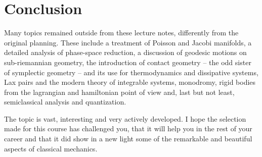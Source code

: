 \documentclass[english,fontsize=11pt,paper=b5]{scrbook}
\numberwithin{equation}{chapter}
\theoremstyle{definition}
\begin{document}
      \chapter{Conclusion}

      Many topics remained outside from these lecture notes, differently from the original planning.
      These include a treatment of Poisson and Jacobi manifolds, a detailed analysis of phase-space reduction, a discussion of geodesic motions on sub-riemannian geometry, the introduction of contact geometry -- the odd sister of symplectic geometry -- and its use for thermodynamics and dissipative systems, Lax pairs and the modern theory of integrable systems, monodromy, rigid bodies from the lagrangian and hamiltonian point of view and, last but not least, semiclassical analysis and quantization.

      The topic is vast, interesting and very actively developed. I hope the selection made for this course has challenged you, that it will help you in the rest of your career and that it did show in a new light some of the remarkable and beautiful aspects of classical mechanics.






\end{document}
